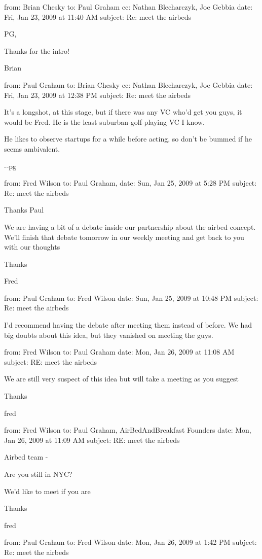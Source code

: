 from: Brian Chesky to: Paul Graham cc: Nathan Blecharczyk, Joe Gebbia
date: Fri, Jan 23, 2009 at 11:40 AM subject: Re: meet the airbeds

PG,

Thanks for the intro!

Brian

from: Paul Graham to: Brian Chesky cc: Nathan Blecharczyk, Joe Gebbia
date: Fri, Jan 23, 2009 at 12:38 PM subject: Re: meet the airbeds

It's a longshot, at this stage, but if there was any VC who'd get you
guys, it would be Fred. He is the least suburban-golf-playing VC I know.

He likes to observe startups for a while before acting, so don't be
bummed if he seems ambivalent.

-\/-pg

from: Fred Wilson to: Paul Graham, date: Sun, Jan 25, 2009 at 5:28 PM
subject: Re: meet the airbeds

Thanks Paul

We are having a bit of a debate inside our partnership about the airbed
concept. We'll finish that debate tomorrow in our weekly meeting and get
back to you with our thoughts

Thanks

Fred

from: Paul Graham to: Fred Wilson date: Sun, Jan 25, 2009 at 10:48 PM
subject: Re: meet the airbeds

I'd recommend having the debate after meeting them instead of before. We
had big doubts about this idea, but they vanished on meeting the guys.

from: Fred Wilson to: Paul Graham date: Mon, Jan 26, 2009 at 11:08 AM
subject: RE: meet the airbeds

We are still very suspect of this idea but will take a meeting as you
suggest

Thanks

fred

from: Fred Wilson to: Paul Graham, AirBedAndBreakfast Founders date:
Mon, Jan 26, 2009 at 11:09 AM subject: RE: meet the airbeds

Airbed team -

Are you still in NYC?

We'd like to meet if you are

Thanks

fred

from: Paul Graham to: Fred Wilson date: Mon, Jan 26, 2009 at 1:42 PM
subject: Re: meet the airbeds

